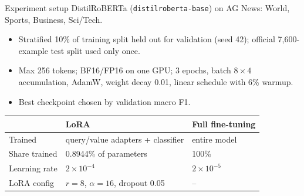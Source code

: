 \documentclass[aspectratio=169,10pt]{beamer}
\gdef\srctext{}
\newcommand{\src}[1]{\gdef\srctext{#1}}
\begin{document}
\begin{frame}{Experiment setup}
	\small DistilRoBERTa (\texttt{distilroberta-base}) on AG News: World, Sports, Business, Sci/Tech.
	\begin{itemize}
		\item Stratified 10\% of training split held out for validation (seed 42); official 7,600-example test split used only once.
		\item Max 256 tokens; BF16/FP16 on one GPU; 3 epochs, batch $8\times4$ accumulation, AdamW, weight decay 0.01, linear schedule with 6\% warmup.
		\item Best checkpoint chosen by validation macro F1.
	\end{itemize}
	\centering\begin{tabular}{lll}\toprule
		              & LoRA                              & Full fine-tuning \\\midrule
		Trained       & query/value adapters + classifier & entire model     \\
		Share trained & 0.8944\% of parameters            & 100\%            \\
		Learning rate & $2\times10^{-4}$                  & $2\times10^{-5}$ \\
		LoRA config   & $r=8$, $\alpha=16$, dropout 0.05  & --               \\\bottomrule
	\end{tabular}
	\src{AG News: Zhang et al. (NeurIPS 2015). Notebook config is $r=8$; the LoRA result files themselves do not record the rank.}\end{frame}
\end{document}
